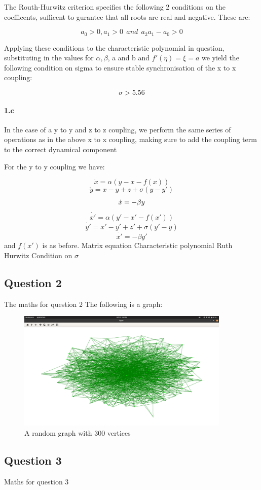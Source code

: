 \documentclass{article}
\begin{document}
The Routh-Hurwitz criterion specifies the following 2 conditions on the coefficents,
sufficent to gurantee that all roots are real and negative. These are:

$$a_{0} > 0, a_{1} > 0 ~~ and ~~ a_{2}a_{1} - a_{0} > 0$$


Applying these conditions to the characteristic polynomial in question, substituting in the values for
$\alpha, \beta$, a and b and $f'(\eta) = \xi = a$ we yield the following condition on sigma to
ensure stable synchronisation of the x to x coupling:

$$\sigma > 5.56$$


\paragraph{1.c} In the case of a y to y and z to z coupling, we perform the same series of operations
as in the above x to x coupling, making sure to add the coupling term to the correct dynamical component

For the y to y coupling we have:

$$\dot{x} = \alpha(y - x - f(x)) $$
$$\dot{y} = x - y + z + \sigma(y - y')$$
$$\dot{x} = -\beta y\newline$$
$$\dot{x'} = \alpha(y' - x' - f(x'))$$
$$\dot{y'} = x' - y' + z' + \sigma(y' - y)$$
$$\dot{x'} = -\beta y'$$
and $f(x')$ is as before.
Matrix equation
Characteristic polynomial
Ruth Hurwitz
Condition on $\sigma$


\subsection*{Question 2}
The maths for question 2
The following is a graph:

\begin{figure}[h]
\centering
\includegraphics[width = 4in]{Screenshot from 2021-10-17 21-43-29.png}
\caption{A random graph with 300 vertices}
\end{figure}


\subsection*{Question 3}
Maths for question 3
\end{document}
